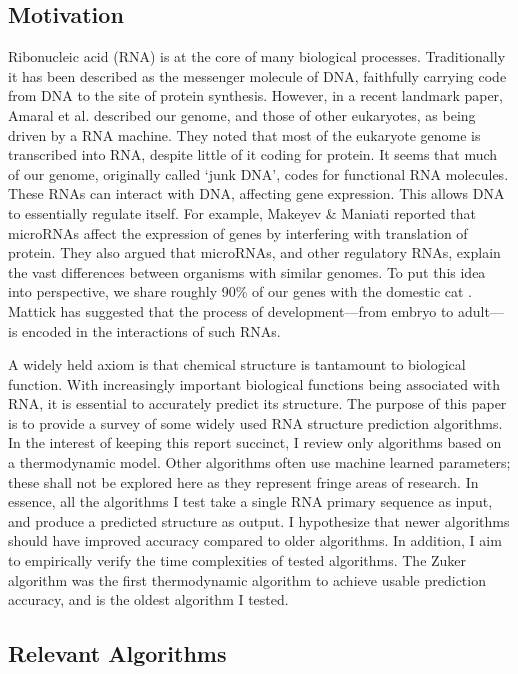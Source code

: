 \documentclass[12pt, a4paper]{article}
\begin{document}
\subsection{Motivation}
Ribonucleic acid (RNA) is at the core of many biological processes. Traditionally it has been described as the messenger molecule of DNA, faithfully carrying code from DNA to the site of protein synthesis. However, in a recent landmark paper, Amaral et al. \cite{amaral2008eukaryotic} described our genome, and those of other eukaryotes, as being driven by a RNA machine. They noted that most of the eukaryote genome is transcribed into RNA, despite little of it coding for protein. It seems that much of our genome, originally called `junk DNA', codes for functional RNA molecules. These RNAs can interact with DNA, affecting gene expression. This allows DNA to essentially regulate itself. For example, Makeyev \& Maniati \cite{makeyev2008multilevel} reported that microRNAs affect the expression of genes by interfering with translation of protein. They also argued that microRNAs, and other regulatory RNAs, explain the vast differences between organisms with similar genomes. To put this idea into perspective, we share roughly 90\% of our genes with the domestic cat \cite{pontius2007initial}. Mattick \cite{mattick2007new} has suggested that the process of development---from embryo to adult---is encoded in the interactions of such RNAs.

A widely held axiom is that chemical structure is tantamount to biological function. With increasingly important biological functions being associated with RNA, it is essential to accurately predict its structure. The purpose of this paper is to provide a survey of some widely used RNA structure prediction algorithms. In the interest of keeping this report succinct, I review only algorithms based on a thermodynamic model. Other algorithms often use machine learned parameters; these shall not be explored here as they represent fringe areas of research. In essence, all the algorithms I test take a single RNA primary sequence as input, and produce a predicted structure as output. I hypothesize that newer algorithms should have improved accuracy compared to older algorithms. In addition, I aim to empirically verify the time complexities of tested algorithms. The Zuker algorithm was the first thermodynamic algorithm to achieve usable prediction accuracy, and is the oldest algorithm I tested.

\subsection{Relevant Algorithms}
\end{document}
